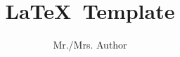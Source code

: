 \documentclass[letter]{article}
\def\authorsname{Mr./Mrs. Author}
\def\course{\LaTeX}
\def\typeoffile{Template}
\begin{document}
\title{\bfseries \course \ \typeoffile}
\author{\authorsname}
\date{}

\maketitle

%






\end{document}
